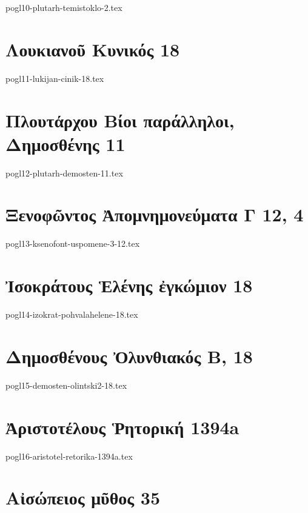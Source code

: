 \documentclass[a4paper,12pt,twoside]{report}
\begin{document}
{pogl10-plutarh-temistoklo-2.tex}

\chapter[Λουκιανοῦ Κυνικός]{\textgreek[variant=ancient]{Λουκιανοῦ Κυνικός} 18}

{pogl11-lukijan-cinik-18.tex}

\chapter[Πλουτάρχου Δημοσθένης]{\textgreek[variant=ancient]{Πλουτάρχου Βίοι παράλληλοι, \\Δημοσθένης} 11}

{pogl12-plutarh-demosten-11.tex}

\chapter[Ξενοφῶντος Ἀπομνημονεύματα Γ]{\textgreek[variant=ancient]{Ξενοφῶντος Ἀπομνημονεύματα Γ} 12, 4}

{pogl13-ksenofont-uspomene-3-12.tex}

\chapter[Ἰσοκράτους Ἑλένης ἐγκώμιον]{\textgreek[variant=ancient]{Ἰσοκράτους Ἑλένης ἐγκώμιον} 18}

{pogl14-izokrat-pohvalahelene-18.tex}

\chapter[Δημοσθένους Ὀλυνθιακός Β]{\textgreek[variant=ancient]{Δημοσθένους Ὀλυνθιακός Β,} 18}

{pogl15-demosten-olintski2-18.tex}

\chapter[Ἀριστοτέλους Ῥητορική]{\textgreek[variant=ancient]{Ἀριστοτέλους Ῥητορική} 1394a}

{pogl16-aristotel-retorika-1394a.tex}

\chapter[Αἰσώπειος μῦθος 35]{\textgreek[variant=ancient]{Αἰσώπειος μῦθος} 35}
\end{document}
